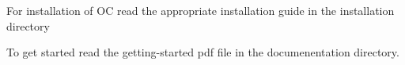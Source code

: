 \documentclass[12pt]{article}
\begin{document}
For installation of OC read the appropriate installation guide in
the installation directory

To get started read the getting-started pdf file in the
documenentation directory.
\end{document}
